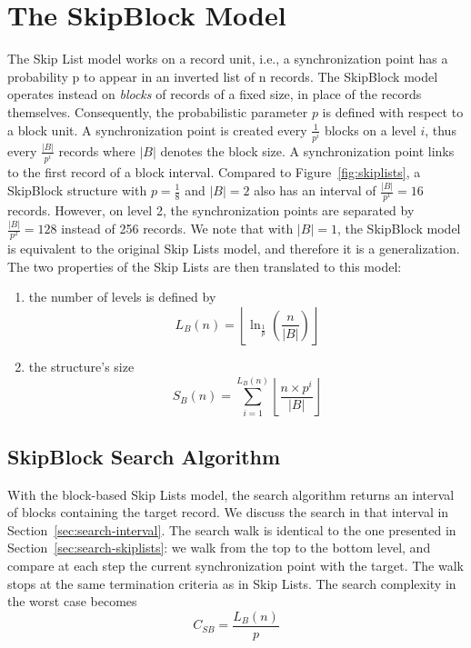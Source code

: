 \section{The SkipBlock Model}
\label{sec:skipbock}

The Skip List model works on a record unit, i.e., a synchronization point has a
probability p to appear in an inverted list of n records.
The SkipBlock model operates instead on \emph{blocks} of records of a fixed
size, in place of the records themselves. Consequently, the probabilistic parameter
$p$ is defined with respect to a block unit. A synchronization point is
created every $\frac{1}{p^i}$ blocks on a level $i$, thus every $\frac{\vert B
\vert}{p^i}$ records where $\vert B \vert$ denotes the block size. A
synchronization point links to the first record of a block interval. Compared
to Figure~\ref{fig:skiplists}, a SkipBlock structure with $p=\frac{1}{8}$ and
$\vert B \vert=2$ also has an interval of $\frac{\vert B \vert}{p^1}=16$
records. However, on level 2, the synchronization points are separated by
$\frac{\vert B \vert}{p^2}=128$ instead of 256 records. We note that with
$\vert B \vert= 1$, the SkipBlock model is equivalent to the original Skip
Lists model, and therefore it is a generalization. The two properties of the
Skip Lists are then translated to this model:
\begin{enumerate}
  \item the number of levels is defined by
\begin{equation}
L_B(n)=\left\lfloor \ln_{\frac{1}{p}}\left(\frac{n}{\vert B \vert}\right) \right\rfloor
\label{eq:skipblock-maxlevels}
\end{equation}
  \item the structure's size
\begin{equation}
S_B(n)=\sum_{i=1}^{
L_B\left(n\right)}{\left\lfloor \frac{n\times p^i}{\vert B \vert}
\right\rfloor}
\label{eq:skipblock-size}
\end{equation}
\end{enumerate}

\subsection{SkipBlock Search Algorithm}
\label{sec:search-skipblock}

With the block-based Skip Lists model, the search algorithm returns an
interval of blocks containing the target record. We discuss the search in
that interval in Section~\ref{sec:search-interval}. The search walk is identical
to the one presented in Section~\ref{sec:search-skiplists}: we walk from the
top to the bottom level, and compare at each step the current synchronization
point with the target. The walk stops at the same termination criteria as in
Skip Lists. The search complexity in the worst case becomes
\begin{equation}
C_{SB}=\frac{L_B(n)}{p}
\label{eq:skipblock-complexity}
\end{equation}

